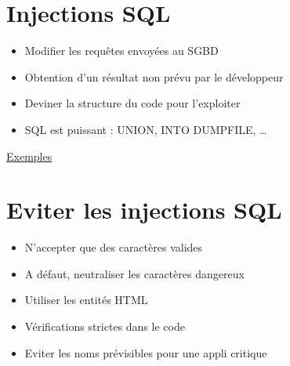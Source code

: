 \hypertarget{injections-sql}{%
\section{Injections SQL}\label{injections-sql}}

\begin{itemize}
\tightlist
\item
  Modifier les requêtes envoyées au SGBD
\item
  Obtention d'un résultat non prévu par le développeur
\item
  Deviner la structure du code pour l'exploiter
\item
  SQL est puissant : UNION, INTO DUMPFILE, \ldots{}
\end{itemize}

\href{https://fr.wikipedia.org/wiki/Injection_SQL}{Exemples}

\begin{english}

\begin{Shaded}
\begin{Highlighting}[]
\OperatorTok{=} 
   
\end{Highlighting}
\end{Shaded}

\end{english}

\hypertarget{eviter-les-injections-sql}{%
\section{Eviter les injections SQL}\label{eviter-les-injections-sql}}

\begin{itemize}
\tightlist
\item
  N'accepter que des caractères valides
\item
  A défaut, neutraliser les caractères dangereux
\item
  Utiliser les entités HTML
\item
  Vérifications strictes dans le code
\item
  Eviter les noms prévisibles pour une appli critique
\end{itemize}


